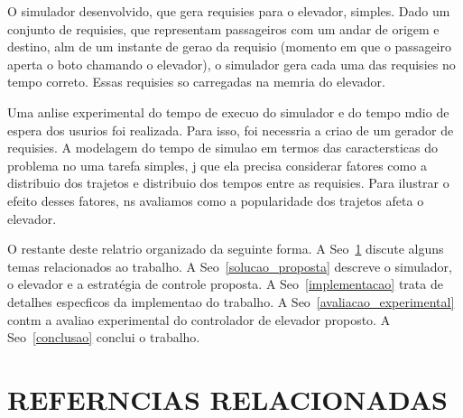 \documentclass[12pt]{article}
\begin{document}
O simulador desenvolvido, que gera requisies para o elevador,  simples. Dado um conjunto de requisies, 
que representam passageiros com um andar de origem e destino, alm de um instante de gerao da requisio 
(momento em que o passageiro aperta o boto chamando o elevador), o simulador gera cada uma das requisies 
no tempo correto. Essas requisies so carregadas na memria do elevador.

Uma anlise experimental do tempo de execuo do simulador e do tempo mdio de espera dos usurios foi 
realizada. Para isso, foi necessria a criao de um gerador de requisies. A modelagem do tempo de simulao 
em termos das caractersticas do problema no  uma tarefa simples, j que ela precisa considerar fatores como 
a distribuio dos trajetos e distribuio dos tempos entre as requisies. Para ilustrar o efeito desses fatores, 
ns avaliamos como a popularidade dos trajetos afeta o elevador.

O restante deste relatrio  organizado da seguinte forma. A Seo~\ref{trabalhos_relacionados} 
discute alguns temas relacionados ao trabalho. A Seo~\ref{solucao_proposta} descreve o simulador, 
o elevador e a estratégia de controle proposta. A Seo~\ref{implementacao} trata de detalhes especficos 
da implementao do trabalho. A Seo~\ref{avaliacao_experimental} contm a avaliao experimental do 
controlador de elevador proposto. A Seo~\ref{conclusao} conclui o trabalho.

\section{REFERNCIAS RELACIONADAS}
\label{trabalhos_relacionados}
\end{document}

